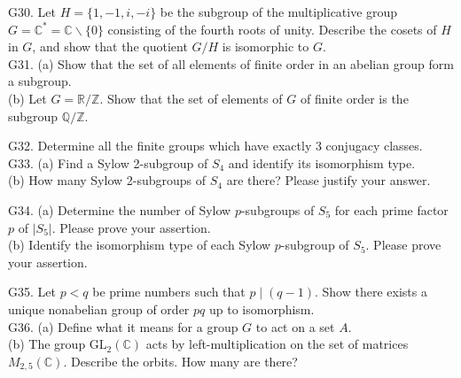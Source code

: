 G30. Let $H=\{1,-1, i,-i\}$ be the subgroup of the multiplicative group $G=\mathbb{C}^{*}=\mathbb{C} \backslash\{0\}$ consisting of the fourth roots of unity. Describe the cosets of $H$ in $G$, and show that the quotient $G / H$ is isomorphic to $G$.\\
G31. (a) Show that the set of all elements of finite order in an abelian group form a subgroup.\\
(b) Let $G=\mathbb{R} / \mathbb{Z}$. Show that the set of elements of $G$ of finite order is the subgroup $\mathbb{Q} / \mathbb{Z}$.

G32. Determine all the finite groups which have exactly 3 conjugacy classes.\\
G33. (a) Find a Sylow 2-subgroup of $S_{4}$ and identify its isomorphism type.\\
(b) How many Sylow 2-subgroups of $S_{4}$ are there? Please justify your answer.

G34. (a) Determine the number of Sylow $p$-subgroups of $S_{5}$ for each prime factor $p$ of $\left|S_{5}\right|$. Please prove your assertion.\\
(b) Identify the isomorphism type of each Sylow $p$-subgroup of $S_{5}$. Please prove your assertion.

G35. Let $p<q$ be prime numbers such that $p \mid(q-1)$. Show there exists a unique nonabelian group of order $p q$ up to isomorphism.\\
G36. (a) Define what it means for a group $G$ to act on a set $A$.\\
(b) The group $\mathrm{GL}_{2}(\mathbb{C})$ acts by left-multiplication on the set of matrices $M_{2,5}(\mathbb{C})$. Describe the orbits. How many are there?